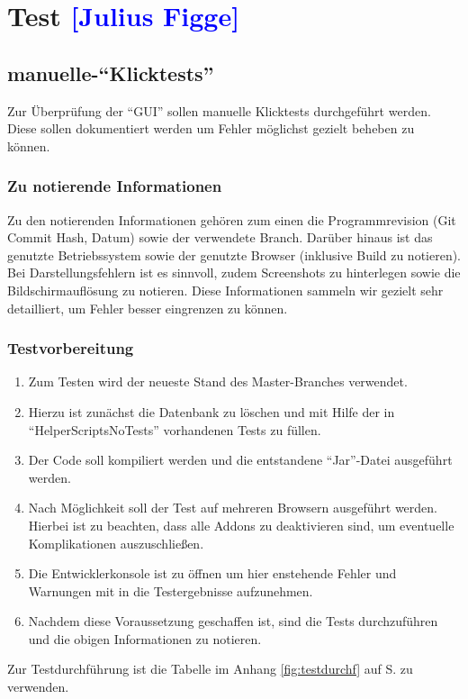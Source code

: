 \section{Test \textcolor{blue}{[Julius Figge]}}

\subsection{manuelle-\enquote{Klicktests}}

Zur Überprüfung der \enquote{GUI} sollen manuelle Klicktests durchgeführt werden.
Diese sollen dokumentiert werden um Fehler möglichst gezielt beheben zu können.\\

\subsubsection*{Zu notierende Informationen}
Zu den notierenden Informationen gehören zum einen die Programmrevision (Git Commit Hash, Datum) sowie der verwendete Branch. Darüber hinaus ist das genutzte Betriebssystem sowie der genutzte Browser (inklusive Build zu notieren).
Bei Darstellungsfehlern ist es sinnvoll, zudem Screenshots zu hinterlegen sowie die Bildschirmauflösung zu notieren.
Diese Informationen sammeln wir gezielt sehr detailliert, um Fehler besser eingrenzen zu können.

\subsubsection*{Testvorbereitung}
\begin{enumerate}
    \item Zum Testen wird der neueste Stand des Master-Branches verwendet.
    \item Hierzu ist zunächst die Datenbank zu löschen und mit Hilfe der in \enquote{HelperScriptsNoTests}        vorhandenen Tests zu füllen.
    \item Der Code soll kompiliert werden und die entstandene \enquote{Jar}-Datei ausgeführt werden.
    \item Nach Möglichkeit soll der Test auf mehreren Browsern ausgeführt werden. Hierbei ist zu beachten, dass alle Addons zu deaktivieren sind, um eventuelle Komplikationen auszuschließen.
    \item Die Entwicklerkonsole ist zu öffnen um hier enstehende Fehler und Warnungen mit in die Testergebnisse aufzunehmen.
    \item Nachdem diese Voraussetzung geschaffen ist, sind die Tests durchzuführen und die obigen Informationen zu notieren.
\end{enumerate}

Zur Testdurchführung ist die Tabelle im Anhang \ref{fig:testdurchf} auf S.\pageref{fig:testdurchf} zu verwenden.


